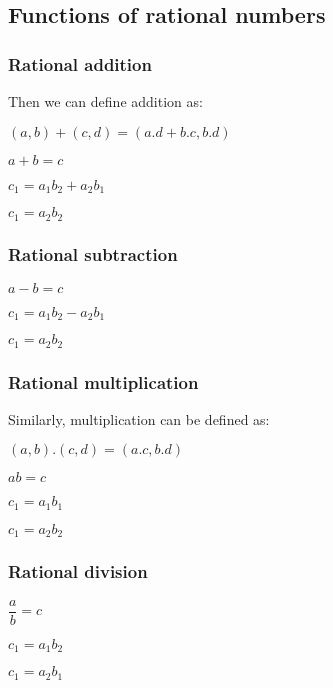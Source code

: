 \subsection{Functions of rational numbers}

\subsubsection{Rational addition}

Then we can define addition as:

\((a,b)+(c,d)=(a.d+b.c,b.d)\)

\(a+b=c\)

\(c_1=a_1b_2+a_2b_1\)

\(c_1=a_2b_2\)

\subsubsection{Rational subtraction}

\(a-b=c\)

\(c_1=a_1b_2-a_2b_1\)

\(c_1=a_2b_2\)

\subsubsection{Rational multiplication}

Similarly, multiplication can be defined as:

\((a,b).(c,d)=(a.c, b.d)\)

\(ab=c\)

\(c_1=a_1b_1\)

\(c_1=a_2b_2\)

\subsubsection{Rational division}

\(\dfrac{a}{b}=c\)

\(c_1=a_1b_2\)

\(c_1=a_2b_1\)

